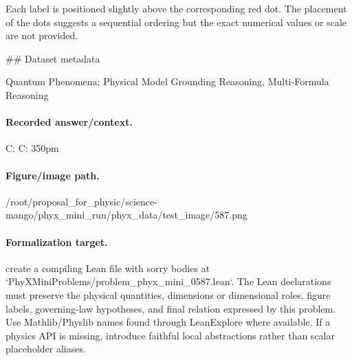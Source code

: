 Each label is positioned slightly above the corresponding red dot. The placement of the dots suggests a sequential ordering but the exact numerical values or scale are not provided.

\#\# Dataset metadata

Quantum Phenomena; Physical Model Grounding Reasoning, Multi-Formula Reasoning

\paragraph{Recorded answer/context.}
C: C: 350pm

\paragraph{Figure/image path.}
/root/proposal\_for\_physic/science-mango/phyx\_mini\_run/phyx\_data/test\_image/587.png

\paragraph{Formalization target.}
create a compiling Lean file with sorry bodies at `PhyXMiniProblems/problem\_phyx\_mini\_0587.lean`. The Lean declarations must preserve the physical quantities, dimensions or dimensional roles, figure labels, governing-law hypotheses, and final relation expressed by this problem.
Use Mathlib/Physlib names found through LeanExplore where available. If a physics API is missing, introduce faithful local abstractions rather than scalar placeholder aliases.

